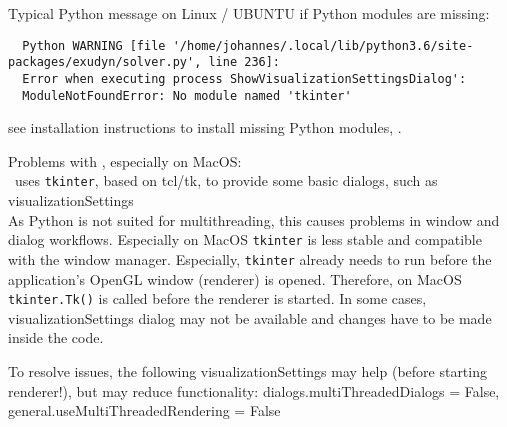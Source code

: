 %
%
\item Typical Python  message on Linux / UBUNTU if Python modules are missing:
\plainlststyle
\begin{lstlisting}
  Python WARNING [file '/home/johannes/.local/lib/python3.6/site-packages/exudyn/solver.py', line 236]: 
  Error when executing process ShowVisualizationSettingsDialog':
  ModuleNotFoundError: No module named 'tkinter'
\end{lstlisting}
\onlyRST{\rstStartNewLine}
%
\item[$\ra$] see installation instructions to install missing Python modules, .

\item Problems with , especially on MacOS:\\
  \codeName\ uses \texttt{tkinter}, based on tcl/tk, to provide some basic dialogs, such as visualizationSettings\\
  As Python is not suited for multithreading, this causes problems in window and dialog workflows. Especially on MacOS
  \texttt{tkinter} is less stable and compatible with the window manager. Especially, \texttt{tkinter} already needs to run
  before the application's OpenGL window (renderer) is opened. Therefore, on MacOS \texttt{tkinter.Tk()} is called before the 
  renderer is started.
  In some cases, visualizationSettings dialog may not be available and changes have to be made inside the code.
  
\item[$\ra$] To resolve issues, the following visualizationSettings may help (before starting renderer!), but may reduce functionality: 
     dialogs.multiThreadedDialogs = False, general.useMultiThreadedRendering = False
\ei 



